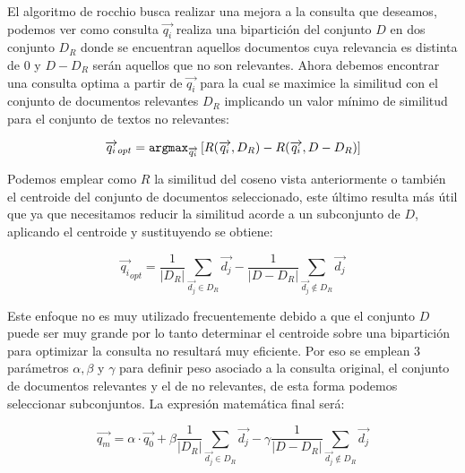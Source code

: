 \documentclass[runningheads,a4paper]{llncs}
\begin{document}
El algoritmo de rocchio busca realizar una mejora a la consulta que deseamos, podemos ver como consulta $\overrightarrow{q_i}$ realiza una bipartición del conjunto $D$ en dos conjunto $D_R$ donde se encuentran aquellos documentos cuya relevancia es distinta de 0 y $D - D_R$ serán aquellos que no son relevantes. Ahora debemos encontrar una consulta optima a partir de $\overrightarrow{q_i}$ para la cual se maximice la similitud con el conjunto de documentos relevantes $D_R$ implicando un valor mínimo de similitud para el conjunto de textos no relevantes:

\begin{equation}
	\overrightarrow{{q_i}}_{opt} = \verb*|argmax|_{\overrightarrow{q_i}} \left[ R(\overrightarrow{q_i}, D_R) - R(\overrightarrow{q_i}, D - D_R) \right] 
\end{equation}

Podemos emplear como $R$ la similitud del coseno vista anteriormente o también el centroide del conjunto de documentos seleccionado, este último resulta más útil que ya que necesitamos reducir la similitud acorde a un subconjunto de $D$, aplicando el centroide y sustituyendo se obtiene:

\begin{equation}
	\overrightarrow{{q_i}}_{opt} = \frac{1}{|D_R|} \sum_{\overrightarrow{d_j} \in D_R} \overrightarrow{d_j} - \frac{1}{|D - D_R|} \sum_{\overrightarrow{d_j} \notin D_R} \overrightarrow{d_j} 
\end{equation}

Este enfoque no es muy utilizado frecuentemente debido a que el conjunto $D$ puede ser muy grande por lo tanto determinar el centroide sobre una bipartición para optimizar la consulta no resultará muy eficiente. Por eso se emplean 3 parámetros $\alpha, \beta $ y $\gamma$  para definir peso asociado a la consulta original, el conjunto de documentos relevantes y el de no relevantes, de esta forma podemos seleccionar subconjuntos. La expresión matemática final será:

\begin{equation}
	\overrightarrow{q_m} = \alpha · \overrightarrow{q_0} + \beta \frac{1}{|D_R|} \sum_{\overrightarrow{d_j} \in D_R} \overrightarrow{d_j} - \gamma \frac{1}{|D - D_R|} \sum_{\overrightarrow{d_j} \notin D_R} \overrightarrow{d_j}
\end{equation}
\end{document}
